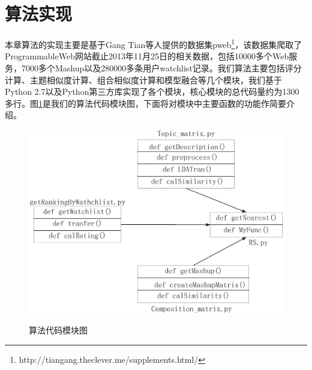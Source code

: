 \documentclass[master,winfonts]{njuthesis}
\begin{document}
\section{算法实现}
本章算法的实现主要是基于Gang Tian等人\cite{Tian2014Time}提供的数据集pweb\footnote{http://tiangang.theclever.me/supplements.html/}，该数据集爬取了ProgrammableWeb网站截止2013年11月25日的相关数据，包括10000多个Web服务，7000多个Mashup以及280000多条用户watchlist记录。我们算法主要包括评分计算、主题相似度计算、组合相似度计算和模型融合等几个模块，我们基于Python 2.7以及Python第三方库实现了各个模块，核心模块的总代码量约为1300多行。图\ref{fig:23}是我们的算法代码模块图，下面将对模块中主要函数的功能作简要介绍。
\begin{figure}[htbp]
  \centering
  \includegraphics[width=\textwidth]{Code1.eps}\\
  \caption{算法代码模块图}\label{fig:23}
\end{figure}
\end{document}
